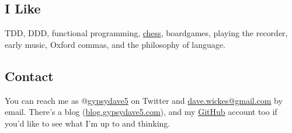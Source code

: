 \documentclass[11pt]{article}
\begin{document}
\subsection*{I Like}
\label{sec:org5ad7dcc}
TDD, DDD, functional programming, \href{https://www.chess.com/member/gypsydave5}{chess}, boardgames, playing the recorder, early music, Oxford commas, and the philosophy of language.

\subsection*{Contact}
\label{sec:org78ba2ac}
You can reach me as @\href{https://twitter.com/gypsydave5}{gypsydave5} on Twitter and \href{mailto:dave@gypsydave5.com}{dave.wickes@gmail.com} by email. There's a blog (\href{http://blog.gypsydave5.com/}{blog.gypsydave5.com}), and my \href{https://github.com/gypsydave5}{GitHub} account too if you'd like to see what I'm up to and thinking.
\end{document}
